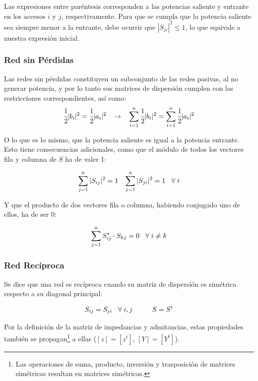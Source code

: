 \documentclass[12pt]{article}
\begin{document}
Las expresiones entre par\'entesis corresponden a las potencias saliente y entrante en los accesos $i$ y $j$, respectivamente. Para que se cumpla que la potencia saliente sea siempre menor a la entrante, debe ocurrir que $|S_{ji}|^2 \leq 1$, lo que equivale a nuestra expresi\'on inicial.

\subsubsection{Red sin P\'erdidas}

Las redes sin p\'erdidas constituyen un subconjunto de las redes pasivas, al no generar potencia, y por lo tanto sus matrices de dispersi\'on cumplen con las restricciones correspondientes, as\'i como:
$$\cfrac{1}{2}|b_i|^2 = \cfrac{1}{2}|a_i|^2 \hspace{0.3cm} \rightarrow \hspace{0.3cm} \sum_{i=1}^n \cfrac{1}{2}|b_i|^2 = \sum_{i=1}^n \cfrac{1}{2}|a_i|^2$$

O lo que es lo mismo, que la potencia saliente es igual a la potencia entrante. Esto tiene consecuencias adicionales, como que el m\'odulo de todos los vectores fila y columna de $S$ ha de valer 1:

$$\sum_{j=1}^n |S_{ij}|^2 = 1 \hspace{0.3cm} \sum_{j=1}^n |S_{ji}|^2 = 1 \hspace{0.3cm} \forall \hspace{0.1cm} i$$

Y que el producto de dos vectores fila o columna, habiendo conjugado uno de ellos, ha de ser 0:

$$\sum_{j=1}^n S_{ij}^* \cdot S_{kj} = 0 \hspace{0.3cm} \forall \hspace{0.1cm} i \neq k$$

\subsubsection{Red Rec\'iproca}

Se dice que una red es rec\'iproca cuando su matriz de dispersi\'on es sim\'etrica respecto a su diagonal principal:

$$S_{ij} = S_{ji} \hspace{0.3cm} \forall \hspace{0.1cm} i,j \hspace{1cm} S = S^t$$

Por la definici\'on de la matriz de impedancias y admitancias, estas propiedades tambi\'en se propagan\footnote{Las operaciones de suma, producto, inversi\'on y trasposici\'on de matrices sim\'etricas resultan en matrices sim\'etricas.} a ellas ($[z] = [z^t]$, $[Y] = [Y^t]$).
\end{document}
